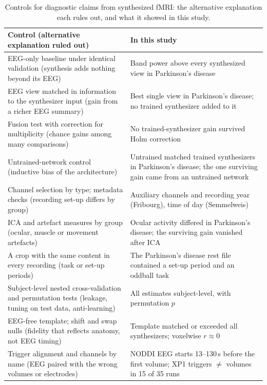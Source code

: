 \documentclass[pdflatex,referee,sn-basic]{sn-jnl}%
\begin{document}
\begin{table}[!tbp]
    \centering
    \caption{Controls for diagnostic claims from synthesized fMRI: the alternative explanation each rules out, and what it showed in this study.}
    \label{tab:checklist}
    \scriptsize\setlength{\tabcolsep}{3pt}
    \begin{tabular}{@{}>{\raggedright\arraybackslash}p{6.0cm}>{\raggedright\arraybackslash}p{6.6cm}@{}}
        \hline
        Control (alternative explanation ruled out) & In this study \\
        \hline
        EEG-only baseline under identical validation (synthesis adds nothing beyond its EEG) & Band power above every synthesized view in Parkinson's disease \\
        EEG view matched in information to the synthesizer input (gain from a richer EEG summary) & Best single view in Parkinson's disease; no trained synthesizer added to it \\
        Fusion test with correction for multiplicity (chance gains among many comparisons) & No trained-synthesizer gain survived Holm correction \\
        Untrained-network control (inductive bias of the architecture) & Untrained matched trained synthesizers in Parkinson's disease; the one surviving gain came from an untrained network \\
        Channel selection by type; metadata checks (recording set-up differs by group) & Auxiliary channels and recording year (Fribourg), time of day (Semmelweis) \\
        ICA and artefact measures by group (ocular, muscle or movement artefacts) & Ocular activity differed in Parkinson's disease; the surviving gain vanished after ICA \\
        A crop with the same content in every recording (task or set-up periods) & The Parkinson's disease rest file contained a set-up period and an oddball task \\
        Subject-level nested cross-validation and permutation tests (leakage, tuning on test data, anti-learning) & All estimates subject-level, with permutation $p$ \\
        EEG-free template; shift and swap nulls (fidelity that reflects anatomy, not EEG timing) & Template matched or exceeded all synthesizers; voxelwise $r\approx0$ \\
        Trigger alignment and channels by name (EEG paired with the wrong volumes or electrodes) & NODDI EEG starts 13--130\,s before the first volume; XP1 triggers $\neq$ volumes in 15 of 35 runs \\
        \hline
    \end{tabular}
\end{table}
\end{document}
